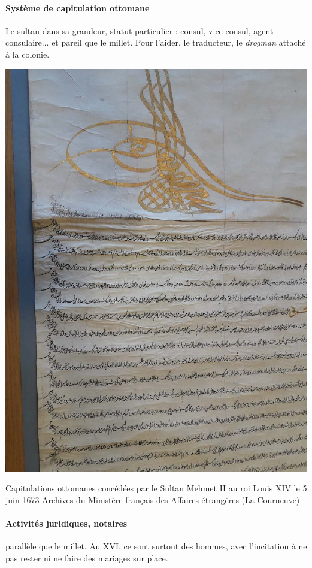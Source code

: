\paragraph{Système de capitulation ottomane} Le sultan dans sa grandeur, statut particulier : consul, vice consul, agent consulaire... et pareil que le millet. Pour l'aider, le traducteur, le \textit{drogman} attaché à la colonie. 
\begin{marginfigure}
    \centering
    \includegraphics[width=\textwidth]{HistoireIslamMediterranee/Images/firman.jpg}
    \caption{Capitulations ottomanes concédées par le Sultan
Mehmet II au roi Louis XIV le 5 juin 1673
Archives du Ministère français des Affaires
étrangères (La Courneuve)}
    \label{fig:my_label}
\end{marginfigure}
\paragraph{Activités juridiques, notaires} parallèle que le millet. Au XVI, ce sont surtout des hommes, avec l'incitation à ne pas rester ni ne faire des mariages sur place.

